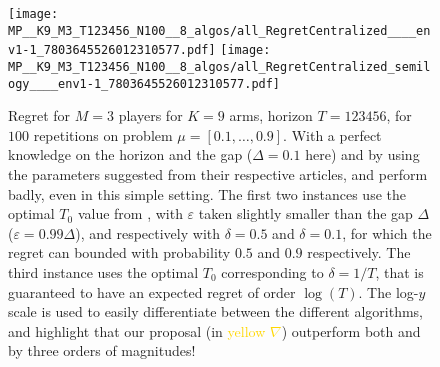 \begin{figure}[!t]
  \centering
      \texttt{[image: MP\_\_K9\_M3\_T123456\_N100\_\_8\_algos/all\_RegretCentralized\_\_\_\_env1-1\_7803645526012310577.pdf]}
      \texttt{[image: MP\_\_K9\_M3\_T123456\_N100\_\_8\_algos/all\_RegretCentralized\_semilogy\_\_\_\_env1-1\_7803645526012310577.pdf]}
  \caption[Regret for $M=3$ players for $K=9$ arms, horizon $T=123456$, for $100$ repetitions on a fixed problem.]{Regret for $M=3$ players for $K=9$ arms, horizon $T=123456$, for $100$ repetitions on problem $\mu=[0.1,\dots,0.9]$. With a perfect knowledge on the horizon and the gap ($\Delta=0.1$ here) and by using the parameters suggested from their respective articles, \MEGA{} and \MusicalChair{} perform badly, even in this simple setting. The first two \MusicalChair{} instances use the optimal $T_0$ value from \cite{Rosenski16}, with $\varepsilon$ taken slightly smaller than the gap $\Delta$ ($\varepsilon=0.99 \Delta$), and respectively with $\delta=0.5$ and $\delta=0.1$, for which the regret can bounded with probability $0.5$ and $0.9$ respectively. The third instance uses the optimal $T_0$ corresponding to $\delta=1/T$, that is guaranteed to have an expected regret of order $\log(T)$. The log-$y$ scale is used to easily differentiate between the different algorithms, and highlight that our proposal (in \textcolor{gold}{yellow $\nabla$}) outperform both \MEGA{} and \MusicalChair{} by three orders of magnitudes!}
  \label{fig:5:MP__K9_M3_T123456_N100__8_algos}
\end{figure}



